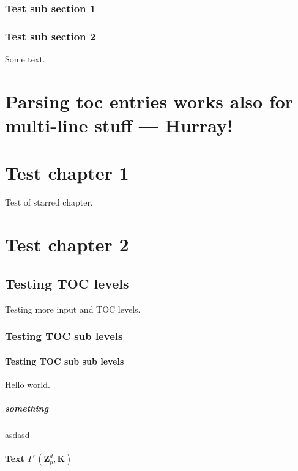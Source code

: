 \subsection{Test sub section 1}

\subsection{Test sub section 2}
Some text.

\chapter[Parsing toc specific entries works 
  also for multi-line --- A second Hurray!]{Parsing {toc entries works
  also for} multi-line \texorpdfstring{stuff}{entries}
--- Hurray!}

\chapter*{Test chapter 1}
Test of starred chapter.

\chapter{Test chapter 2}
\label{chap:second test}

\section{Testing TOC levels}
Testing more input and TOC levels.

\subsection{Testing TOC sub levels}

\subsubsection{Testing TOC sub sub levels}
Hello world.

\paragraph{something}
asdasd

\subsubsection{Text $\Gamma^{r}(\ensuremath{{\mathbf{Z}}}_p^d,\mathbf{K})$}

